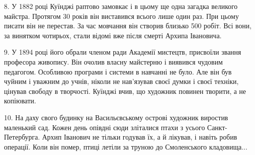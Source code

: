 8. У 1882 році Куїнджі раптово замовкає і в цьому ще одна загадка великого
майстра. Протягом 30 років він виставився всього лише один раз. При цьому
писати він не перестав. За час мовчання він створив близько 500 робіт. Всі
вони, за винятком чотирьох, стали відомі вже після смерті Архипа Івановича.

9. У 1894 році його обрали членом ради Академії мистецтв, присвоїли звання
професора живопису. Він очолив власну майстерню і виявився чудовим педагогом.
Особливою програми і системи в навчанні не було. Але він був чуйним і уважним
до учнів, ніколи не нав'язував своєї думки і своєї техніки, цінував свободу в
творчості. Куїнджі вчив, що художник повинен творити, а не копіювати.

10. На даху свого будинку на Васильєвському острові художник виростив маленький
сад. Кожен день опівдні сюди зліталися птахи з усього Санкт-Петербурга. Архип
Іванович не тільки годував їх, а й лікував, і навіть робив операції. Коли він
помер, птиці летіли за труною до Смоленського кладовища...

